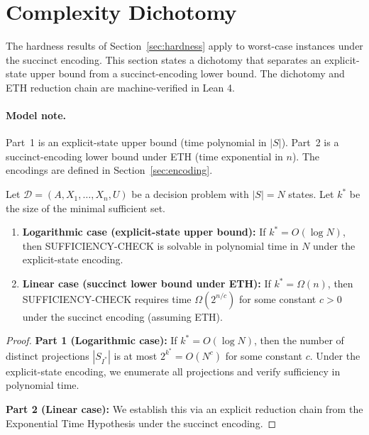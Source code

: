 \section{Complexity Dichotomy}\label{sec:dichotomy}

The hardness results of Section~\ref{sec:hardness} apply to worst-case instances under the succinct encoding. This section states a dichotomy that separates an explicit-state upper bound from a succinct-encoding lower bound. The dichotomy and ETH reduction chain are machine-verified in Lean 4.

\paragraph{Model note.} Part~1 is an explicit-state upper bound (time polynomial in $|S|$). Part~2 is a succinct-encoding lower bound under ETH (time exponential in $n$). The encodings are defined in Section~\ref{sec:encoding}.

\begin{theorem}\label{thm:dichotomy}
Let $\mathcal{D} = (A, X_1, \ldots, X_n, U)$ be a decision problem with $|S| = N$ states. Let $k^*$ be the size of the minimal sufficient set.

\begin{enumerate}
\item \textbf{Logarithmic case (explicit-state upper bound):} If $k^* = O(\log N)$, then SUFFICIENCY-CHECK is solvable in polynomial time in $N$ under the explicit-state encoding.

\item \textbf{Linear case (succinct lower bound under ETH):} If $k^* = \Omega(n)$, then SUFFICIENCY-CHECK requires time $\Omega(2^{n/c})$ for some constant $c > 0$ under the succinct encoding (assuming ETH).
\end{enumerate}
\end{theorem}

\begin{proof}
\textbf{Part 1 (Logarithmic case):} If $k^* = O(\log N)$, then the number of distinct projections $|S_{I^*}|$ is at most $2^{k^*} = O(N^c)$ for some constant $c$. Under the explicit-state encoding, we enumerate all projections and verify sufficiency in polynomial time.

\textbf{Part 2 (Linear case):} We establish this via an explicit reduction chain from the Exponential Time Hypothesis under the succinct encoding.
\end{proof}

